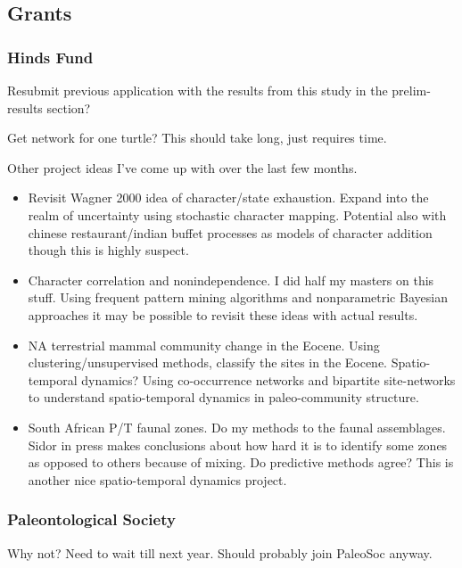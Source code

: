 \documentclass{article}\usepackage{graphicx, color}
\begin{document}
\subsection{Grants}
\subsubsection{Hinds Fund}
Resubmit previous application with the results from this study in the prelim-results section?

Get network for one turtle? This should take long, just requires time.

Other project ideas I've come up with over the last few months.

\begin{itemize}
  \item Revisit Wagner 2000 idea of character/state exhaustion. Expand into the realm of uncertainty using stochastic character mapping. Potential also with chinese restaurant/indian buffet processes as models of character addition though this is highly suspect.
  \item Character correlation and nonindependence. I did half my masters on this stuff. Using frequent pattern mining algorithms and nonparametric Bayesian approaches it may be possible to revisit these ideas with actual results.
  \item NA terrestrial mammal community change in the Eocene. Using clustering/unsupervised methods, classify the sites in the Eocene. Spatio-temporal dynamics? Using co-occurrence networks and bipartite site-networks to understand spatio-temporal dynamics in paleo-community structure.
  \item South African P/T faunal zones. Do my methods to the faunal assemblages. Sidor in press makes conclusions about how hard it is to identify some zones as opposed to others because of mixing. Do predictive methods agree? This is another nice spatio-temporal dynamics project.
\end{itemize}

\subsubsection{Paleontological Society}
Why not? Need to wait till next year. Should probably join PaleoSoc anyway.
\end{document}

